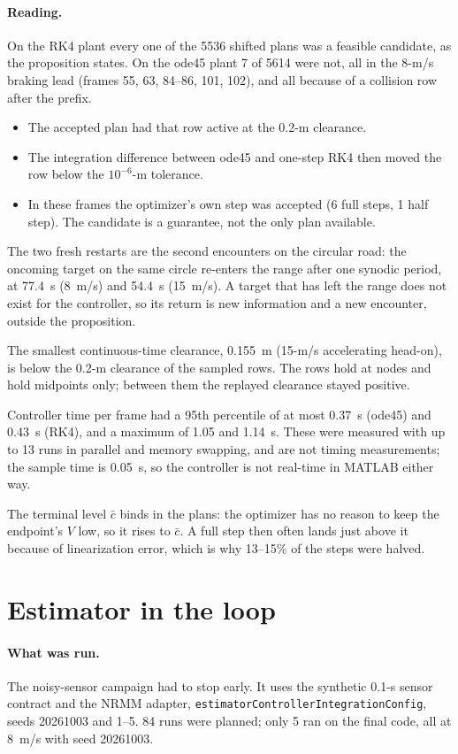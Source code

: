 \documentclass[11pt]{article}
\begin{document}
\paragraph{Reading.} On the RK4 plant every one of the 5536 shifted plans was
a feasible candidate, as the proposition states. On the ode45 plant 7 of
5614 were not, all in the 8-m/s braking lead (frames 55, 63, 84--86, 101,
102), and all because of a collision row after the prefix.
\begin{itemize}
\item The accepted plan had that row active at the 0.2-m clearance.
\item The integration difference between ode45 and one-step RK4 then moved
  the row below the $10^{-6}$-m tolerance.
\item In these frames the optimizer's own step was accepted (6 full steps,
  1 half step). The candidate is a guarantee, not the only plan available.
\end{itemize}
The two fresh restarts are the second encounters on the circular road: the
oncoming target on the same circle re-enters the range after one synodic
period, at 77.4~s (8~m/s) and 54.4~s (15~m/s). A target that has left the
range does not exist for the controller, so its return is new information
and a new encounter, outside the proposition.

The smallest continuous-time clearance, 0.155~m (15-m/s accelerating
head-on), is below the 0.2-m clearance of the sampled rows. The rows hold at
nodes and hold midpoints only; between them the replayed clearance stayed
positive.

Controller time per frame had a 95th percentile of at most 0.37~s (ode45)
and 0.43~s (RK4), and a maximum of 1.05 and 1.14~s. These were measured with
up to 13 runs in parallel and memory swapping, and are not timing
measurements; the sample time is 0.05~s, so the controller is not real-time
in MATLAB either way.

The terminal level $\bar c$ binds in the plans: the optimizer has no reason
to keep the endpoint's $V$ low, so it rises to $\bar c$. A full step then often
lands just above it because of linearization error, which is why 13--15\% of
the steps were halved.

\section{Estimator in the loop}
\paragraph{What was run.} The noisy-sensor campaign had to stop early. It
uses the synthetic 0.1-s sensor contract and the NRMM adapter,
\texttt{estimatorControllerIntegrationConfig}, seeds 20261003 and 1--5. 84
runs were planned; only 5 ran on the final code, all at 8~m/s with seed
20261003.
\end{document}
